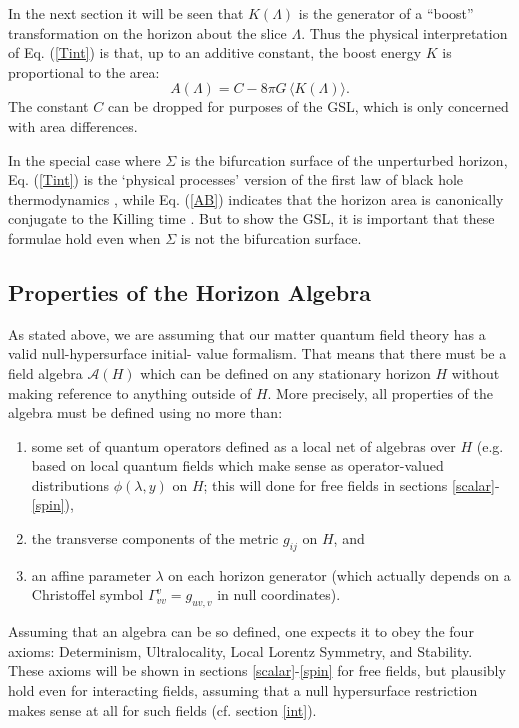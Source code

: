 \documentclass[12pt]{article}
\begin{document}
In the next section it will be seen that $K(\Lambda)$ is the generator of a ``boost'' transformation on the horizon about the slice $\Lambda$.  Thus the physical interpretation of Eq. (\ref{Tint}) is that, up to an additive constant, the boost energy $K$ is proportional to the area:
\begin{equation}\label{AB}
A(\Lambda) = C - 8\pi G\, \langle K(\Lambda) \rangle.
\end{equation}
The constant $C$ can be dropped for purposes of the GSL, which is only concerned with area differences.

In the special case where $\Sigma$ is the bifurcation surface of the unperturbed horizon, Eq. (\ref{Tint}) is the `physical processes' version of the first law of black hole thermodynamics \cite{GW01}, while Eq. (\ref{AB}) indicates that the horizon area is canonically conjugate to the Killing time \cite{CT93}.  But to show the GSL, it is important that these formulae hold even when $\Sigma$ is not the bifurcation surface.

\subsection{Properties of the Horizon Algebra}\label{sym}

As stated above, we are assuming that our matter quantum field theory has a valid null-hypersurface initial- value formalism.  That means that there must be a field algebra $\mathcal{A}(H)$ which can be defined on any stationary horizon $H$ without making reference to anything outside of $H$.  More precisely, all properties of the algebra must be defined using no more than:
\begin{enumerate}
\item some set of quantum operators defined as a local net of algebras over $H$ (e.g. based on local quantum fields which make sense as operator-valued distributions $\phi(\lambda, y)$ on $H$; this will done for free fields in  sections \ref{scalar}-\ref{spin}),
\item the transverse components of the metric $g_{ij}$ on $H$, and
\item an affine parameter $\lambda$ on each horizon generator (which actually depends on a Christoffel symbol $\Gamma^v_{vv} = g_{uv,v}$ in null coordinates).
\end{enumerate}
Assuming that an algebra can be so defined, one expects it to obey the four axioms: Determinism, Ultralocality, Local Lorentz Symmetry, and Stability.  These axioms will be shown in sections \ref{scalar}-\ref{spin} for free fields, but plausibly hold even for interacting fields, assuming that a null hypersurface restriction makes sense at all for such fields (cf. section \ref{int}).
\end{document}
